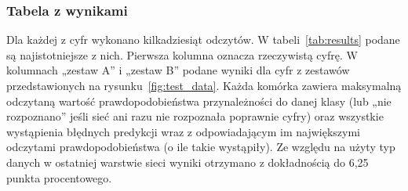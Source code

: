 \documentclass[12pt, oneside, a4paper]{article}
\begin{document}
\subsubsection{Tabela z wynikami}\label{sec:Tabela z wynikami}
Dla każdej z cyfr wykonano kilkadziesiąt odczytów. W tabeli~\ref{tab:results}
podane są najistotniejsze z nich.
Pierwsza kolumna oznacza rzeczywistą cyfrę. W kolumnach „zestaw A” i „zestaw B”
podane wyniki dla cyfr z zestawów przedstawionych
na rysunku~\ref{fig:test_data}.
Każda komórka zawiera maksymalną odczytaną wartość prawdopodobieństwa
przynależności do danej klasy (lub „nie rozpoznano” jeśli sieć ani razu
nie rozpoznała poprawnie cyfry)
oraz wszystkie wystąpienia błędnych predykcji wraz z odpowiadającym im
największymi odczytami prawdopodobieństwa (o ile takie wystąpiły).
Ze względu na użyty typ danych w ostatniej warstwie sieci
wyniki otrzymano z dokładnością do 6,25 punkta procentowego.
\end{document}
